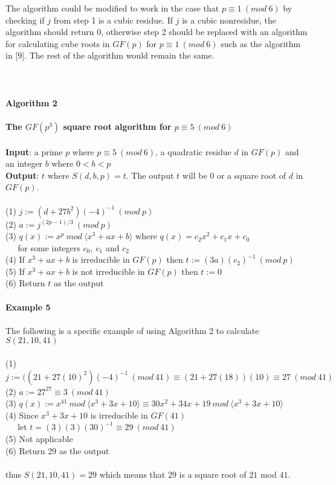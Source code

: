 \documentclass[final,letterpaper,oneside,10pt]{article}
\begin{document}
The algorithm could be modified to work in the case that $p \equiv 1~(mod~6)$ by checking if $j$ from step 1 is a cubic residue.  If $j$ is a cubic
nonresidue, the algorithm should return $0$, otherwise step 2 should be replaced with an algorithm for calculating cube roots in $GF(p)$ for
$p \equiv 1~(mod~6)$ such as the algorithm in [9].  The rest of the algorithm would remain the same.
\\
\\
\\
\\
\textbf{Algorithm 2}
\\
\\
\textbf{The $GF(p^3)$ square root algorithm for $p \equiv 5~(mod~6)$}
\\
\\
\textbf{Input}: a prime $p$ where $p \equiv 5~(mod~6)$, a quadratic residue $d$ in $GF(p)$
and an integer $b$ where $0<b<p$
\\
\textbf{Output}: $t$ where $S(d,b,p) = t$. The output $t$ will be $0$ or a square root of $d$ in $GF(p)$.
\\
\\
(1) $j :=(d+27b^2)(-4)^{-1}~(mod~p)$
\\
(2) $a:=j^{(2p-1)/3}~(mod~p)$
\\
(3) $q(x):= x^p~mod~ \langle x^3 + ax + b \rangle$ where $q(x) = c_2x^2+c_1x+c_0$
\\
$~~~~~$ for some integers $c_0,~c_1$ and $c_2$
\\
(4) If $x^3+ax+b$ is irreducible in $GF(p)$ then $t:=(3a)(c_2)^{-1}~(mod~p)$
\\
(5) If $x^3+ax+b$ is not irreducible in $GF(p)$ then $t:=0$
\\
(6) Return $t$ as the output
\\
\\
\textbf{Example 5}
\\
\\
The following is a specific example of using Algorithm 2 to calculate $S(21,10,41)$
\\
\\
(1) $j := ((21+27(10)^2)(-4)^{-1}~(mod~41) \equiv(21+27(18))(10) \equiv27~(mod~41)$
\\
(2) $a:=27^{27} \equiv3~(mod~41)$
\\
(3) $q(x) := x^{41}~mod~ \langle x^3 + 3x + 10 \rangle \equiv 30x^2 + 34x + 19 ~mod~ \langle x^3+3x+10 \rangle $
\\
(4) Since $x^3+3x+10$ is irreducible in $GF(41)$ 
\\
$~~~~~$ let $t=(3)(3)(30)^{-1} \equiv 29~(mod~41)$
\\
(5) Not applicable
\\
(6) Return 29 as the output
\\
\\
thus $S(21,10,41)=29$ which means that $29$ is a square root of $21$ mod $41$.
\end{document}

